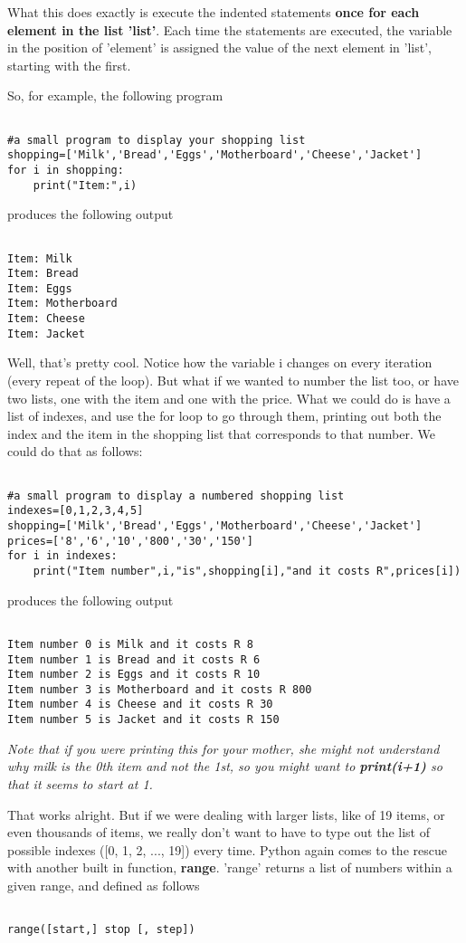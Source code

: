 What this does exactly is execute the indented statements   \textbf{once for each element in the list 'list'}. Each time   the statements are executed, the variable in the position of 'element'   is assigned the value of the next element in 'list', starting with the   first.

So, for example, the following program
\begin{lstlisting}

#a small program to display your shopping list
shopping=['Milk','Bread','Eggs','Motherboard','Cheese','Jacket']
for i in shopping:
	print("Item:",i)
\end{lstlisting}

produces the following output
\begin{lstlisting}

Item: Milk
Item: Bread
Item: Eggs
Item: Motherboard
Item: Cheese
Item: Jacket
\end{lstlisting}

Well, that's pretty cool. Notice how the variable i changes on every iteration (every repeat of the loop). But what if we wanted to number the list too, or have two lists, one with the item and one with the price. What we could do is have a list of indexes, and use the for loop to go through them, printing out both the index and the item in the shopping list that corresponds to that number. We could do that as follows: 
\begin{lstlisting}

#a small program to display a numbered shopping list
indexes=[0,1,2,3,4,5]
shopping=['Milk','Bread','Eggs','Motherboard','Cheese','Jacket']
prices=['8','6','10','800','30','150']
for i in indexes:
	print("Item number",i,"is",shopping[i],"and it costs R",prices[i])
\end{lstlisting}   produces the following output  
\begin{lstlisting}

Item number 0 is Milk and it costs R 8
Item number 1 is Bread and it costs R 6
Item number 2 is Eggs and it costs R 10
Item number 3 is Motherboard and it costs R 800
Item number 4 is Cheese and it costs R 30
Item number 5 is Jacket and it costs R 150
\end{lstlisting}

\textit{Note that if you were printing this for your mother, she might not understand why milk is the 0th item and not the 1st, so you might want to \textbf{print(i+1)} so that it seems to start at 1.}

 That works alright. But if we were dealing with larger lists,   like of 19 items, or even thousands of items, we really don't   want to have to type out the list of possible indexes ([0, 1, 2, ...,   19]) every time. Python again comes to the rescue with another built in   function, \textbf{range}.   'range' returns a list of numbers within a given range, and defined as   follows
\begin{lstlisting}

range([start,] stop [, step])
\end{lstlisting}

